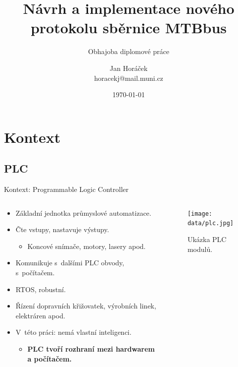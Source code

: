 \documentclass[aspectratio=169]{beamer}
\title[MTB v4]{Návrh a implementace nového protokolu sběrnice MTBbus}
\subtitle[Obhajoba]{Obhajoba diplomové práce}
\author[J. Horáček]{Jan Horáček\texorpdfstring{\\}{, }horacekj@mail.muni.cz}
\institute[FI MU]{Fakulta informatiky Masarykovy univerzity}
\date{\today}
\begin{document}
\begin{frame}[plain]
\maketitle
\end{frame}

\section{Kontext}
\subsection{PLC}


\begin{frame}{Kontext: Programmable Logic Controller}
\begin{columns}
	\begin{column}{.6\textwidth}
		\begin{itemize}
		\item Základní jednotka průmyslové automatizace.
		\item Čte vstupy, nastavuje výstupy.
			\begin{itemize}
			\item Koncové snímače, motory, lasery apod.
		\end{itemize}
		\item Komunikuje s dalšími PLC obvody, s počítačem.
		\item RTOS, robustní.
		\item Řízení dopravních křižovatek, výrobních linek, elektráren apod.
		\item V této práci: nemá vlastní inteligenci.
		\begin{itemize}
		\item \textbf{PLC tvoří rozhraní mezi hardwarem a počítačem.}
		\end{itemize}
		\end{itemize}
	\end{column}
	\begin{column}{.4\textwidth}
		\begin{figure}
		\texttt{[image: data/plc.jpg]}
		\caption{Ukázka PLC modulů.}
		\end{figure}
	\end{column}
\end{columns}
\end{frame}

\end{document}
